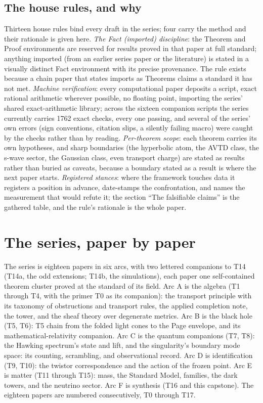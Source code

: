 \documentclass[11pt]{article}
\theoremstyle{definition}
\theoremstyle{plain}
\begin{document}
\subsection*{The house rules, and why}
\label{c:note.programme.setting-house-rules-why}
Thirteen house rules bind every draft in the series; four carry the method and their rationale is given here. \emph{The Fact (imported) discipline}: the Theorem and Proof environments are reserved for results proved in that paper at full standard; anything imported (from an earlier series paper or the literature) is stated in a visually distinct Fact environment with its precise provenance. The rule exists because a chain paper that states imports as Theorems claims a standard it has not met. \emph{Machine verification}: every computational paper deposits a script, exact rational arithmetic wherever possible, no floating point, importing the series' shared exact-arithmetic library; across the sixteen companion scripts the series currently carries 1762 exact checks, every one passing, and several of the series' own errors (sign conventions, citation slips, a silently failing macro) were caught by the checks rather than by reading. \emph{Per-theorem scope}: each theorem carries its own hypotheses, and sharp boundaries (the hyperbolic atom, the AVTD class, the s-wave sector, the Gaussian class, even transport charge) are stated as results rather than buried as caveats, because a boundary stated as a result is where the next paper starts. \emph{Registered stances}: where the framework touches data it registers a position in advance, date-stamps the confrontation, and names the measurement that would refute it; the section ``The falsifiable claims'' is the gathered table, and the rule's rationale is the whole paper.

\section{The series, paper by paper}

\label{c:note.programme.setting-series-paper-paper}
The series is eighteen papers in six arcs, with two lettered companions to T14 (T14a, the odd extensions; T14b, the simulations), each paper one self-contained theorem cluster proved at the standard of its field. Arc A is the algebra (T1 through T4, with the primer T0 as its companion): the transport principle with its taxonomy of obstructions and transport rules, the applied completion note, the tower, and the sheaf theory over degenerate metrics. Arc B is the black hole (T5, T6): T5 chain from the folded light cones to the Page envelope, and its mathematical-relativity companion. Arc C is the quantum companions (T7, T8): the Hawking spectrum's state and lift, and the singularity's boundary mode space: its counting, scrambling, and observational record. Arc D is identification (T9, T10): the twistor correspondence and the action of the frozen point. Arc E is matter (T11 through T15): mass, the Standard Model, families, the dark towers, and the neutrino sector. Arc F is synthesis (T16 and this capstone). The eighteen papers are numbered consecutively, T0 through T17.
\end{document}
